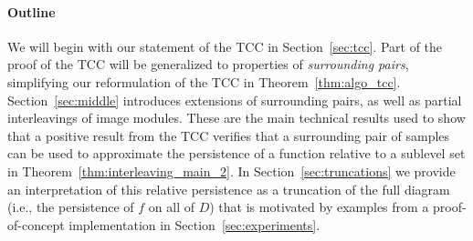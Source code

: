 %
%
%

\paragraph*{Outline}

We will begin with our statement of the TCC in Section~\ref{sec:tcc}.
Part of the proof of the TCC will be generalized to properties of \emph{surrounding pairs}, simplifying our reformulation of the TCC in Theorem~\ref{thm:algo_tcc}.
Section~\ref{sec:middle} introduces extensions of surrounding pairs, as well as partial interleavings of image modules.
These are the main technical results used to show that a positive result from the TCC verifies that a surrounding pair of samples can be used to approximate the persistence of a function relative to a sublevel set in Theorem~\ref{thm:interleaving_main_2}.
In Section~\ref{sec:truncations} we provide an interpretation of this relative persistence as a truncation of the full diagram (i.e., the persistence of $f$ on all of $D$) that is motivated by examples from a proof-of-concept implementation in Section~\ref{sec:experiments}.
